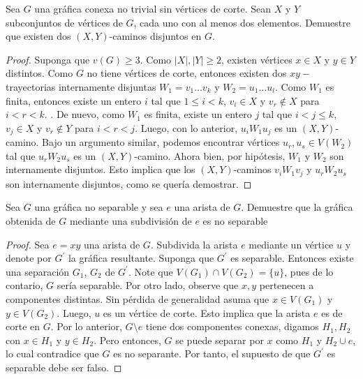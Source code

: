 \documentclass[12pt]{article}
\newenvironment{problem}[2][Problema]{\begin{trivlist}
\item[\hskip \labelsep {\bfseries #1}\hskip \labelsep {\bfseries #2.}]}{\end{trivlist}}
\begin{document}
\begin{problem}{5.1.4} Sea $G$ una gráfica conexa no trivial sin vértices de corte. Sean $X$ y $Y$ subconjuntos de vértices de $G$, cada uno con al menos dos elementos. Demuestre que existen dos $(X,Y)$-caminos disjuntos en $G.$ 
\end{problem}
\begin{proof}
Suponga que $v(G) \geq 3$. Como $\lvert X \rvert, \lvert Y \rvert \geq 2$, existen vértices $x\in X$ y $y \in Y$ distintos. Como $G$ no tiene vértices de corte, entonces existen dos $xy-$trayectorias internamente disjuntas $W_1 = v_1\ldots v_k$ y $W_2 = u_1 \ldots u_l.$ Como $W_1$ es finita, entonces existe un entero $i$ tal que $1 \leq i < k$, $v_i \in X$ y $v_{r} \notin X$ para $i < r < k.$ . De nuevo, como $W_1$ es finita, existe un entero $j$ tal que $i < j \leq k$, $v_j \in X$ y $v_r \notin Y$ para $i < r < j.$ Luego, con lo anterior,  $u_i W_1 u_j$ es un $(X, Y)$-camino. Bajo un argumento similar, podemos encontrar vértices $u_r, u_s \in V(W_2)$ tal que $u_r W_2 u_s$ es un $(X, Y)$-camino. Ahora bien, por hipótesis, $W_1$ y $W_2$ son internamente disjuntos. Esto implica que los $(X,Y)$-caminos $v_i W_1 v_j$ y $u_r W_2 u_s$ son internamente disjuntos, como se quería demostrar.
\end{proof}


\begin{problem}{5.2.1} Sea $G$ una gráfica no separable y sea $e$ una arista de $G$. Demuestre que la gráfica obtenida de $G$ mediante una subdivisión de $e$ es no separable 
\end{problem}
\begin{proof}
Sea $e=xy$ una arista de $G$. 
Subdivida la arista $e$ mediante un vértice $u$ y denote por $G^\prime$ la gráfica resultante. Suponga que $G^\prime$ es separable. Entonces existe una separación $G_1$, $G_2$ de $G^\prime$. Note que $V(G_1) \cap V(G_2) = \{u\}$, pues de lo contario, $G$ sería separable. Por otro lado, observe que $x,y$ pertenecen a componentes distintas. Sin pérdida de generalidad asuma que $x \in V(G_1)$ y $y \in V(G_2).$ Luego, $u$ es un vértice de corte. Esto implica que la arista $e$ es de corte en $G.$ Por lo anterior, $G\setminus e$ tiene dos componentes conexas, digamos $H_1, H_2$ con $x \in H_1$ y $y\in H_2.$ Pero entonces, $G$ se puede separar por $x$ como $H_1$ y $H_2 \cup e$, lo cual contradice que $G$ es no separante. Por tanto, el supuesto de que $G^\prime$ es separable debe ser falso.
\end{proof}
\end{document}
